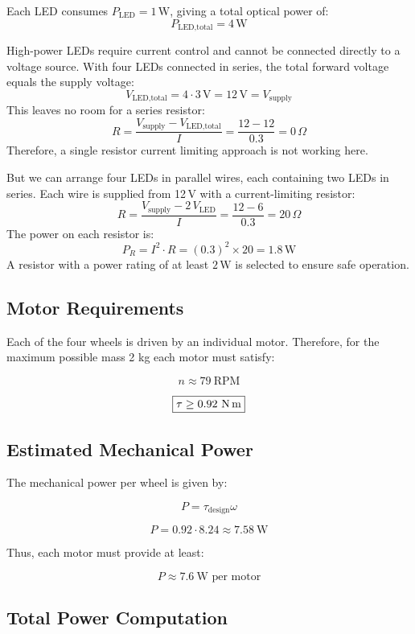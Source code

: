 \documentclass{article}
\begin{document}
Each LED consumes \(P_{\text{LED}} = 1\,\text{W}\), giving a total optical power of:
\[
\boxed{P_{\text{LED,total}} = 4\,\text{W}}
\]

High-power LEDs require current control and cannot be connected directly to a voltage source.
With four LEDs connected in series, the total forward voltage equals the supply voltage:
\[
V_{\text{LED,total}} = 4 \cdot 3\,\text{V} = 12\,\text{V} = V_{\text{supply}}
\]
This leaves no room for a series resistor:
\[
R = \frac{V_{\text{supply}} - V_{\text{LED,total}}}{I} = \frac{12 - 12}{0.3} = 0\,\Omega
\]
Therefore, a single resistor current limiting approach is not working here.

But we can arrange four LEDs in parallel wires, each containing two LEDs in series.
Each wire is supplied from 12\,V with a current-limiting resistor:
\[
R = \frac{V_{\text{supply}} - 2\,V_{\text{LED}}}{I} = \frac{12 - 6}{0.3} = 20\,\Omega
\]
The power on each resistor is:
\[
P_R = I^2 \cdot R = (0.3)^2 \times 20 = 1.8\,\text{W}
\]
A resistor with a power rating of at least \(2\,\text{W}\) is selected to ensure safe operation.


\subsection{Motor Requirements}

Each of the four wheels is driven by an individual motor. Therefore, for the maximum possible mass {2 kg} each motor must satisfy:

\[
\boxed{n \approx 79\ \text{RPM}}
\]

\[
\boxed{\tau \ge 0.92\ \text{N\,m}}
\]

\subsection{Estimated Mechanical Power}

The mechanical power per wheel is given by:

\[
P = \tau_{\text{design}} \omega
\]

\[
P = 0.92 \cdot 8.24 \approx 7.58\ \text{W}
\]

Thus, each motor must provide at least:

\[
\boxed{P \approx 7.6\ \text{W per motor}}
\]


\subsection{Total Power Computation}
\end{document}
